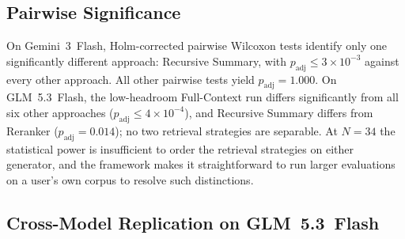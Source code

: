 \documentclass[conference,a4paper,10pt]{IEEEtran}
\begin{document}
\subsection{Pairwise Significance}
\label{sec:significance}

On Gemini~3~Flash, Holm-corrected pairwise Wilcoxon tests identify only one significantly different approach: Recursive Summary, with $p_{\mathrm{adj}} \leq 3 \times 10^{-3}$ against every other approach.
All other pairwise tests yield $p_{\mathrm{adj}} = 1.000$.
On GLM~5.3~Flash, the low-headroom Full-Context run differs significantly from all six other approaches ($p_{\mathrm{adj}} \leq 4 \times 10^{-4}$), and Recursive Summary differs from Reranker ($p_{\mathrm{adj}} = 0.014$); no two retrieval strategies are separable.
At $N = 34$ the statistical power is insufficient to order the retrieval strategies on either generator, and the framework makes it straightforward to run larger evaluations on a user's own corpus to resolve such distinctions.

\subsection{Cross-Model Replication on GLM~5.3~Flash}
\label{sec:crossmodel}
\end{document}
